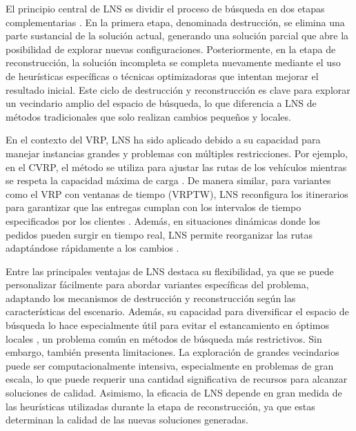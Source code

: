 \documentclass[12pt]{article}
\begin{document}
El principio central de LNS es dividir el proceso de búsqueda en dos etapas complementarias \agregaesto{[REF]}. En la primera etapa, denominada destrucción, se elimina una parte sustancial de la solución actual, generando una solución parcial que abre la posibilidad de explorar nuevas configuraciones. Posteriormente, en la etapa de reconstrucción, la solución incompleta se completa nuevamente mediante el uso de heurísticas específicas o técnicas optimizadoras que intentan mejorar el resultado inicial. Este ciclo de destrucción y reconstrucción es clave para explorar un vecindario amplio del espacio de búsqueda, lo que diferencia a LNS de métodos tradicionales que solo realizan cambios pequeños y locales.


En el contexto del VRP, LNS ha sido  aplicado debido a su capacidad para manejar instancias grandes y problemas con múltiples restricciones. Por ejemplo, en el CVRP, el método se utiliza para ajustar las rutas de los vehículos mientras se respeta la capacidad máxima de carga \agregaesto{[REF]}. De manera similar, para variantes como el VRP con ventanas de tiempo (VRPTW), LNS reconfigura los itinerarios para garantizar que las entregas cumplan con los intervalos de tiempo especificados por los clientes \agregaesto{[REF]}. Además, en situaciones dinámicas donde los pedidos pueden surgir en tiempo real, LNS permite reorganizar las rutas adaptándose rápidamente a los cambios \agregaesto{[REF]}.

Entre las principales ventajas de LNS destaca su flexibilidad, ya que se puede personalizar fácilmente para abordar variantes específicas del problema, adaptando los mecanismos de destrucción y reconstrucción según las características del escenario. Además, su capacidad para diversificar el espacio de búsqueda lo hace especialmente útil para evitar el estancamiento en óptimos locales \agregaesto{[REF]}, un problema común en métodos de búsqueda más restrictivos. Sin embargo, también presenta limitaciones. La exploración de grandes vecindarios puede ser computacionalmente intensiva, especialmente en problemas de gran escala, lo que puede requerir una cantidad significativa de recursos para alcanzar soluciones de calidad. Asimismo, la eficacia de LNS depende en gran medida de las heurísticas utilizadas durante la etapa de reconstrucción, ya que estas determinan la calidad de las nuevas soluciones generadas.
\end{document}
